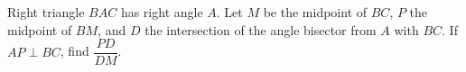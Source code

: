 Right triangle $BAC$ has right angle $A$. Let $M$ be the midpoint of $BC$, $P$ the midpoint of $BM$, and $D$ the intersection of the angle bisector from $A$ with $BC$. If $AP\perp BC$, find $\dfrac{PD}{DM}$.
